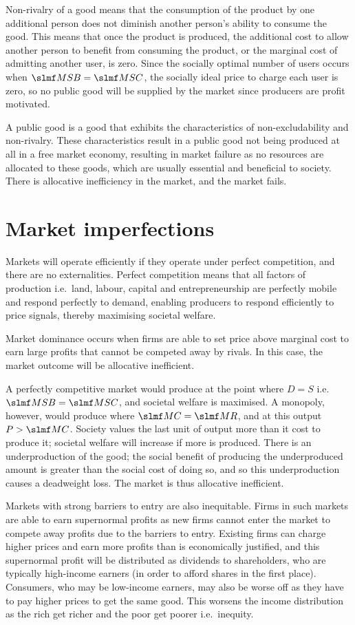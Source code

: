\documentclass[Economics.tex]{subfiles}
\begin{document}
Non-rivalry of a good means that the consumption of the product by one additional person does not diminish another person's ability to consume the good. This means that once the product is produced, the additional cost to allow another person to benefit from consuming the product, or the marginal cost of admitting another user, is zero. Since the socially optimal number of users occurs when \(\mrg{SB} = \mrg{SC}\), the socially ideal price to charge each user is zero, so no public good will be supplied by the market since producers are profit motivated.

A public good is a good that exhibits the characteristics of non-excludability and non-rivalry. These characteristics result in a public good not being produced at all in a free market economy, resulting in market failure as no resources are allocated to these goods, which are usually essential and beneficial to society. There is allocative inefficiency in the market, and the market fails.
\section{Market imperfections}
Markets will operate efficiently if they operate under perfect competition, and there are no externalities. Perfect competition means that all factors of production i.e.\ land, labour, capital and entrepreneurship are perfectly mobile and respond perfectly to demand, enabling producers to respond efficiently to price signals, thereby maximising societal welfare.

Market dominance occurs when firms are able to set price above marginal cost to earn large profits that cannot be competed away by rivals. In this case, the market outcome will be allocative inefficient.

A perfectly competitive market would produce at the point where \(D = S\) i.e.\ \(\mrg{SB} = \mrg{SC}\), and societal welfare is maximised. A monopoly, however, would produce where \(\mrg{C} = \mrg{R}\), and at this output \(P > \mrg{C}\). Society values the last unit of output more than it cost to produce it; societal welfare will increase if more is produced. There is an underproduction of the good; the social benefit of producing the underproduced amount is greater than the social cost of doing so, and so this underproduction causes a deadweight loss. The market is thus allocative inefficient.

Markets with strong barriers to entry are also inequitable. Firms in such markets are able to earn supernormal profits as new firms cannot enter the market to compete away profits due to the barriers to entry. Existing firms can charge higher prices and earn more profits than is economically justified, and this supernormal profit will be distributed as dividends to shareholders, who are typically high-income earners (in order to afford shares in the first place). Consumers, who may be low-income earners, may also be worse off as they have to pay higher prices to get the same good. This worsens the income distribution as the rich get richer and the poor get poorer i.e.\ inequity.
\end{document}
